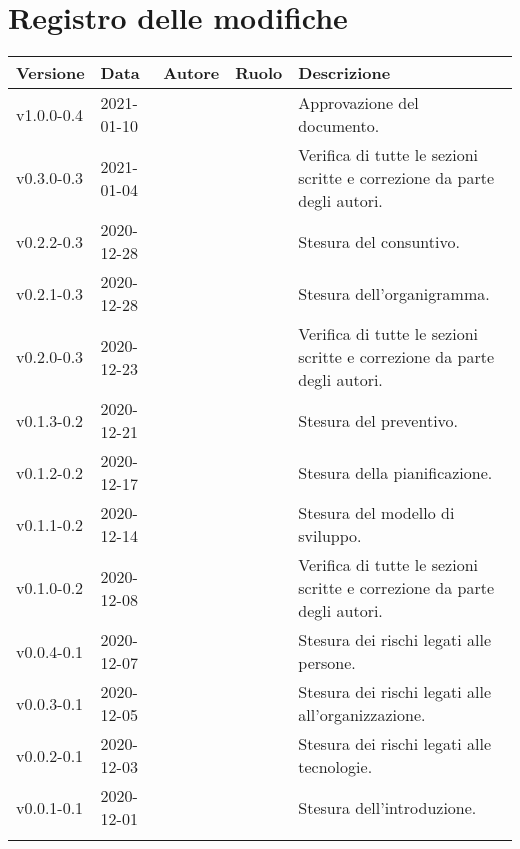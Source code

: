 \section*{\hfil Registro delle modifiche \hfil}
{
	\newlength{\freewidth}
	\setlength{\freewidth}{\dimexpr\textwidth-10\tabcolsep}
	\renewcommand{\arraystretch}{1.5}
	\centering
	\setlength{\aboverulesep}{0pt}
	\setlength{\belowrulesep}{0pt}
	\begin{longtable}{C{.131777\freewidth} C{.134036\freewidth} C{.263554\freewidth} C{.188254\freewidth} C{.282379\freewidth}}
		\toprule 
		\textbf{Versione} & \textbf{Data} & \textbf{Autore} & \textbf{Ruolo} & \textbf{Descrizione}\\
		\toprule
		\endhead

		v1.0.0-0.4 & 2021-01-10 & \Daniele{} & \RdP{} & Approvazione del documento. \\
		v0.3.0-0.3 & 2021-01-04 & \Lucrezia{} & \ver{} & Verifica di tutte le sezioni scritte e correzione da parte degli autori. \\

		v0.2.2-0.3 & 2020-12-28 & \Tommaso{} & \ana{} & Stesura del consuntivo. \\
		v0.2.1-0.3 & 2020-12-28 & \Matteo{} & \ana{} & Stesura dell'organigramma. \\

		v0.2.0-0.3 & 2020-12-23 & \Giosue{} & \ver{} & Verifica di tutte le sezioni scritte e correzione da parte degli autori. \\
		v0.1.3-0.2 & 2020-12-21 & \Tommaso{} & \ana{} & Stesura del preventivo. \\
		v0.1.2-0.2 & 2020-12-17 & \Tommaso{} & \ana{} & Stesura della pianificazione. \\
		v0.1.1-0.2 & 2020-12-14 & \Matteo{} & \ana{} & Stesura del modello di sviluppo. \\

		v0.1.0-0.2 & 2020-12-08 & \Davide & \ver{} & Verifica di tutte le sezioni scritte e correzione da parte degli autori. \\
		v0.0.4-0.1 & 2020-12-07 & \Matteo{} & \ana{} & Stesura dei rischi legati alle persone. \\
		v0.0.3-0.1 & 2020-12-05 & \Matteo{} & \ana{} & Stesura dei rischi legati alle all'organizzazione. \\
		v0.0.2-0.1 & 2020-12-03 & \Matteo{} & \ana{} & Stesura dei rischi legati alle tecnologie. \\
		v0.0.1-0.1 & 2020-12-01 & \Tommaso{} & \ana{} & Stesura dell'introduzione. \\
		
		\bottomrule
		\hiderowcolors
	\end{longtable}
}
